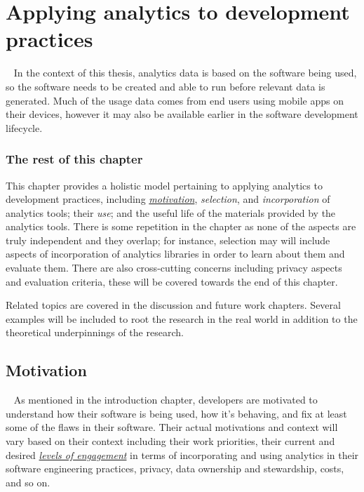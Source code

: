 \chapter{Applying analytics to development practices}~\label{chapter-applying-analytics-to-development-practices}
In the context of this thesis, analytics data is based on the software being used, so the software needs to be created and able to run before relevant data is generated. Much of the usage data comes from end users using mobile apps on their devices, however it may also be available earlier in the software development lifecycle.


\subsection{The rest of this chapter}
This chapter provides a holistic model pertaining to applying analytics to development practices, including \href{motivation-section}{\textit{motivation}}, \textit{selection}, and \textit{incorporation} of analytics tools; their \textit{use}; and the useful life of the materials provided by the analytics tools. There is some repetition in the chapter as none of the aspects are truly independent and they overlap; for instance, selection may will include aspects of incorporation of analytics libraries in order to learn about them and evaluate them. There are also cross-cutting concerns including privacy aspects and evaluation criteria, these will be covered towards the end of this chapter.

Related topics are covered in the discussion and future work chapters. Several examples will be included to root the research in the real world in addition to the theoretical underpinnings of the research.


\section{Motivation}~\label{motivation-section}
As mentioned in the introduction chapter, developers are motivated to understand how their software is being used, how it's behaving, and fix at least some of the flaws in their software. Their actual motivations and context will vary based on their context including their work priorities, their current and desired \href{subsection-levels-of-engagement}{\emph{levels of engagement}} in terms of incorporating and using analytics in their software engineering practices, privacy, data ownership and stewardship, costs, and so on.

